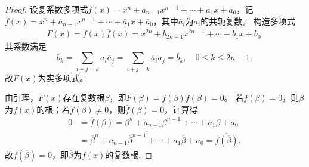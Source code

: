 \documentclass[../../main.tex]{subfiles}%
\begin{document}
\begin{proof}

设复系数多项式$f(x)=x^n+a_{n-1}x^{n-1}+\cdots+a_1x+a_0$，记$\overline{f}(x)=x^n+\overline{a}_{n-1}x^{n-1}+\cdots+\overline{a}_1x+\overline{a}_0$，其中$\overline{a}_i$为$a_i$的共轭复数。
构造多项式
\begin{align}
F(x)=f(x)\overline{f}(x)=x^{2n}+b_{2n-1}x^{2n-1}+\cdots+b_1x+b_0.\label{eq:F-poly}
\end{align}
其系数满足
$$b_k=\sum\limits_{i+j=k}a_i\overline{a}_j=\sum\limits_{i+j=k}\overline{a}_i a_j=\overline{b}_k,\quad 0\leqslant k\leqslant 2n-1,$$
故$F(x)$为实多项式。

由引理，$F(x)$存在复数根$\beta$，即$F(\beta)=f(\beta)\overline{f}(\beta)=0$。
若$f(\beta)=0$，则$\beta$为$f(x)$的根；若$f(\beta)\neq0$，则$\overline{f}(\beta)=0$，计算得
\begin{align*}
0&=\overline{f}(\beta)=\beta^n+\overline{a}_{n-1}\beta^{n-1}+\cdots+\overline{a}_1\beta+\overline{a}_0\\
&=\overline{\overline{\beta}^n+a_{n-1}\overline{\beta}^{n-1}+\cdots+a_1\overline{\beta}+a_0}=\overline{f(\overline{\beta})},
\end{align*}
故$f(\overline{\beta})=0$，即$\overline{\beta}$为$f(x)$的复数根.

\end{proof}
\end{document}
